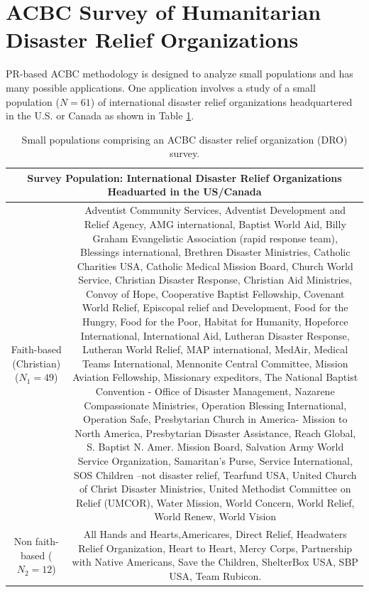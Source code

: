\documentclass[a4paper, 12pt]{article}
\begin{document}
\section{ACBC Survey of Humanitarian Disaster Relief Organizations}

PR-based ACBC methodology is designed to analyze small populations and has many possible applications. One application involves  a study of a small population ($N=61$) of international  disaster relief organizations headquartered in the U.S. or Canada as shown in Table \ref{ORGS}.


\begin{table}[!htpb]
	\scriptsize
	\centering
	\begin{tabular}{c|c}\hline
		\multicolumn{2}{c}{Survey Population: International Disaster Relief Organizations Headuarted in the US/Canada}\\\hline
		Faith-based (Christian)($N_1=49$) & \multicolumn{1}{m{2.75in}}{Adventist Community Services, Adventist Development and Relief Agency,	AMG international,	Baptist World Aid, Billy Graham Evangelistic Association (rapid response team), Blessings international, Brethren Disaster Ministries,	Catholic Charities USA, Catholic Medical Mission Board,	Church World Service, Christian Disaster Response,
			Christian Aid Ministries, Convoy of Hope, Cooperative Baptist Fellowship, Covenant World Relief,
			Episcopal relief and Development, Food for the Hungry, Food for the Poor, Habitat for Humanity,	Hopeforce International,
			International Aid, Lutheran Disaster Response, Lutheran World Relief, MAP international, MedAir,
			Medical Teams International, Mennonite Central Committee, Mission Aviation Fellowship, Missionary expeditors,
			The National Baptist Convention - Office of Disaster Management, Nazarene Compassionate Ministries,	Operation Blessing International,
			Operation Safe, Presbytarian Church in America- Mission to North America, Presbytarian Disaster Assistance,
			Reach Global, S. Baptist N. Amer. Mission Board, Salvation Army World Service Organization, 	Samaritan's Purse,
			Service International, SOS Children --not disaster relief, Tearfund USA, United Church of Christ Disaster Ministries,
			United Methodist Committee on Relief (UMCOR), Water Mission, World Concern,	World Relief, World Renew, World Vision	}\\\hline
		Non faith-based 	($N_2=12$)&	\multicolumn{1}{m{2.75in}}{ All Hands and Hearts,Americares, Direct Relief, Headwaters Relief Organization,	Heart to Heart, Mercy Corps, Partnership with Native Americans, 	Save the Children, 	ShelterBox USA, 	SBP USA,	Team Rubicon.}\\\hline
	\end{tabular}
	\caption{Small populations comprising an ACBC disaster relief organization (DRO) survey.}
	\label{ORGS}
\end{table}
\end{document}
